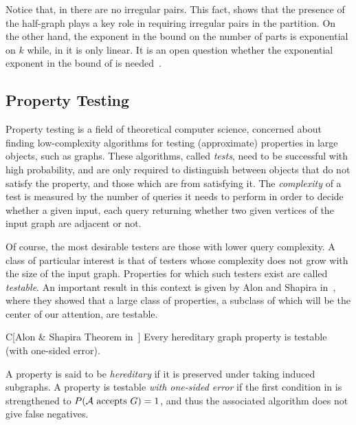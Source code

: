         Notice that, in  there are no irregular pairs.
        This fact, shows that the presence of the half-graph plays a key role in requiring irregular pairs in the partition.
        On the other hand, the exponent in the bound on the number of parts is exponential on $k$ while,
        in  it is only linear.
        It is an open question whether the exponential exponent in the bound of  is
        needed~\cite{julia_wolf_private_comunication}.

    \subsection{Property Testing} \label{subsec:subsection_1.3}

        Property testing is a field of theoretical computer science, concerned about finding low-complexity algorithms
        for testing (approximate) properties in large objects, such as graphs.
        These algorithms, called \emph{tests}, need to be successful with high probability, and are only required to distinguish between objects
        that do not satisfy the property, and those which are  from satisfying it.
        The \emph{complexity} of a test is measured by the number of queries it needs to perform in order to decide
        whether a given input, each query returning whether two given vertices of the input graph are adjacent or not.

        Of course, the most desirable testers are those with lower query complexity.
        A class of particular interest is that of testers whose complexity does not grow with the size of the input
        graph.
        Properties for which such testers exist are called \emph{testable}.
        An important result in this context is given by Alon and Shapira
        in~\cite{a_characterization_of_the_natural_graph_properties_testable_with_one_sided_error}, where they
        showed that a large class of properties, a subclass of which will be the center of our attention, are testable.

        \begin{thm*}{C}[Alon \& Shapira Theorem in~\cite{a_characterization_of_the_natural_graph_properties_testable_with_one_sided_error}]
            \label{thm:alon_and_shapira_theorem}
            Every hereditary graph property is testable (with one-sided error).
        \end{thm*}

        A property is said to be \emph{hereditary} if it is preserved under taking induced subgraphs.
        A property is testable \emph{with one-sided error} if the first condition in 
        is strengthened to $P( \mathcal{A} \text{ accepts } G ) = 1$, and thus the associated algorithm does
        not give false negatives.

